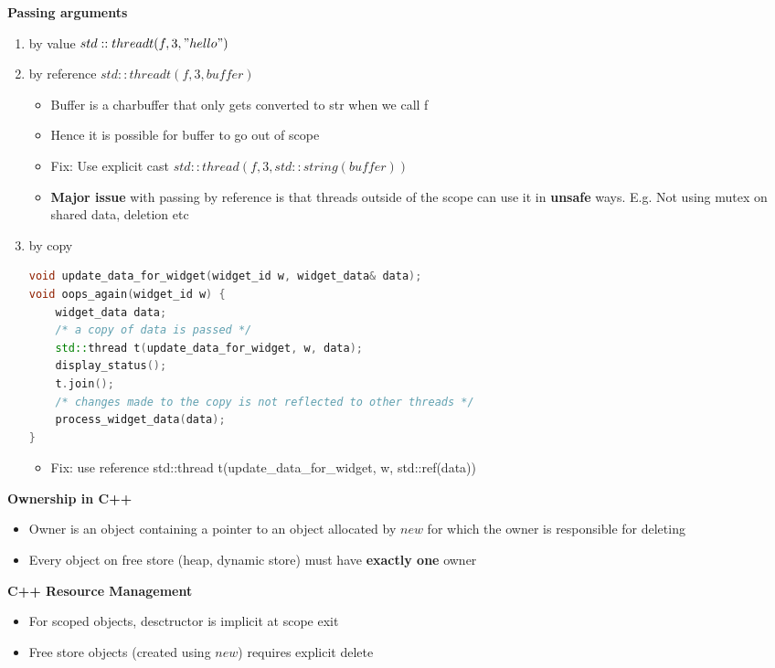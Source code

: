 \documentclass[10pt, landscape]{article}
\begin{document}
\begin{multicols}{4}
\textbf{Passing arguments} \\
\begin{enumerate}
    \item by value $std::thread t(f, 3, "hello")$
    \item by reference $std::thread t(f, 3, buffer)$
    \begin{itemize}
        \item Buffer is a charbuffer that only gets converted to str when we call f
        \item Hence it is possible for buffer to go out of scope 
        \item Fix: Use explicit cast $std::thread(f, 3, std::string(buffer))$ 
        \item \textbf{Major issue} with passing by reference is that threads outside of the scope can use it in \textbf{unsafe} ways. E.g. Not using mutex on shared data, deletion etc 
    \end{itemize}

    \item by copy
    \begin{lstlisting}[language=c++, breaklines=true, breakatwhitespace=true]
void update_data_for_widget(widget_id w, widget_data& data);
void oops_again(widget_id w) {
    widget_data data;
    /* a copy of data is passed */
    std::thread t(update_data_for_widget, w, data);
    display_status();
    t.join();
    /* changes made to the copy is not reflected to other threads */
    process_widget_data(data);
}
    \end{lstlisting}
    \begin{itemize}
        \item Fix: use reference std::thread t(update\_data\_for\_widget, w, std::ref(data))
    \end{itemize} 
\end{enumerate}



\textbf{Ownership in C++} \\ 
\begin{itemize}
    \item Owner is an object containing a pointer to an object allocated by $new$ for which the owner is responsible for deleting
    \item Every object on free store (heap, dynamic store) must have \textbf{exactly one} owner
\end{itemize}

\textbf{C++ Resource Management} \\ 
\begin{itemize}
    \item For scoped objects, desctructor is implicit at scope exit 
    \item Free store objects (created using $new$) requires explicit delete
\end{itemize}



\end{multicols}
\end{document}
